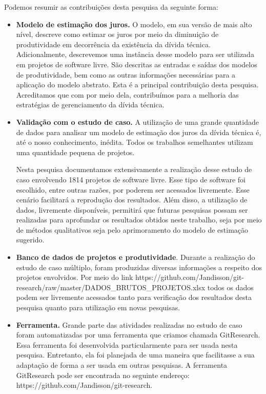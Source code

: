 Podemos resumir as contribuições desta pesquisa da seguinte forma:

\begin{itemize}
\item \textbf{Modelo de estimação dos juros.} O modelo, em sua versão de mais alto nível, descreve como estimar os juros por meio da diminuição de produtividade em decorrência da existência da dívida técnica. Adicionalmente, descrevemos uma instância desse modelo para ser utilizada em projetos de software livre. São descritas as entradas e saídas dos modelos de produtividade, bem como as outras informações necessárias para a aplicação do modelo abstrato. Esta é a principal contribuição desta pesquisa. Acreditamos que com por meio dela, contribuímos para a melhoria das estratégias de gerenciamento da dívida técnica. 
\item \textbf{Validação com o estudo de caso.} A utilização de uma grande quantidade de dados para analisar um modelo de estimação dos juros da dívida técnica é, até o nosso conhecimento, inédita. Todos os trabalhos semelhantes utilizam uma quantidade pequena de projetos. 

Nesta pesquisa documentamos extensivamente a realização desse estudo de caso envolvendo 1814 projetos de software livre. Esse tipo de software foi escolhido, entre outras razões, por poderem ser acessados livremente. Esse cenário facilitará a reprodução dos resultados. Além disso, a utilização de dados, livremente disponíveis, permitirá que futuras pesquisas possam ser realizadas para aprofundar os resultados obtidos neste trabalho, seja por meio de métodos qualitativos seja pelo aprimoramento do modelo de estimação sugerido. 
\item \textbf{Banco de dados de projetos e produtividade}. Durante a realização do estudo de caso múltiplo, foram produzidas diversas informações a respeito dos projetos envolvidos. Por meio do link https://github.com/Jandisson/git-research/raw/master/DADOS\_BRUTOS\_PROJETOS.xlsx todos os dados podem ser livremente acessados tanto para verificação dos resultados desta pesquisa quanto para utilização em novas pesquisas.
\item \textbf{Ferramenta.} Grande parte das atividades realizadas no estudo de caso foram automatizadas por uma ferramenta que criamos chamada GitResearch. Essa ferramenta foi desenvolvida particularmente para ser usada nesta pesquisa. Entretanto, ela foi planejada de uma maneira que facilitasse a sua adaptação  de forma a ser usada em outras pesquisas. A ferramenta GitResearch pode ser encontrada no seguinte endereço: https://github.com/Jandisson/git-research.
\end{itemize}

